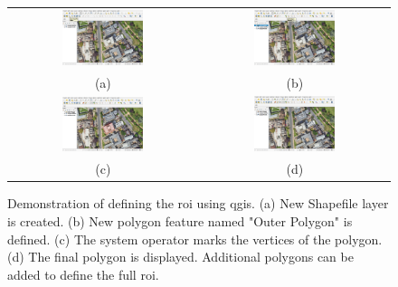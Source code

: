 \begin{figure}[h!]
    \centering
    \begin{tabular}{cc}
        \includegraphics[width=0.45\textwidth]{figs/Jihwan/qgis_a.png} &
        \includegraphics[width=0.45\textwidth]{figs/Jihwan/qgis_b.png} \\
        (a) & (b) \\[10pt]
        \includegraphics[width=0.45\textwidth]{figs/Jihwan/qgis_c.png} &
        \includegraphics[width=0.45\textwidth]{figs/Jihwan/qgis_d.png} \\
        (c) & (d)
    \end{tabular}
    \caption[Demonstration of ROI Definition using QGIS]
    {Demonstration of defining the \gls{roi} using \gls{qgis}. (a) New Shapefile layer is created. (b) New polygon feature named "Outer Polygon" is defined. (c) The system operator marks the vertices of the polygon. (d) The final polygon is displayed. Additional polygons can be added to define the full \gls{roi}.}
    \label{fig:msp_qgis}
\end{figure}

